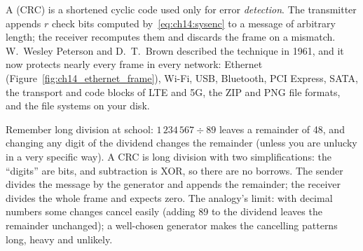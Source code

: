 A  (CRC) is a shortened cyclic code used only for error
\emph{detection}. The transmitter appends $r$ check bits computed by~\eqref{eq:ch14:sysenc} to a
message of arbitrary length; the receiver recomputes them and discards the frame on a mismatch.
W.~Wesley Peterson and D.~T.~Brown described the technique in 1961, and it now protects nearly
every frame in every network: Ethernet (Figure~\ref{fig:ch14_ethernet_frame}), Wi-Fi, USB, Bluetooth,
PCI Express, SATA, the transport and code blocks of LTE and 5G, the ZIP and PNG file formats, and the
file systems on your disk.


\begin{analogy}
Remember long division at school: $1\,234\,567\div89$ leaves a remainder of 48, and changing any
digit of the dividend changes the remainder (unless you are unlucky in a very specific way). A CRC
is long division with two simplifications: the ``digits'' are bits, and subtraction is XOR, so there
are no borrows. The sender divides the message by the generator and appends the remainder; the
receiver divides the whole frame and expects zero. The analogy's limit: with decimal numbers some
changes cancel easily (adding 89 to the dividend leaves the remainder unchanged); a well-chosen
generator makes the cancelling patterns long, heavy and unlikely.
\end{analogy}


